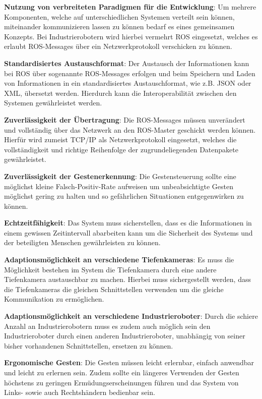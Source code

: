 \begin{compactitem}
    \item \textbf{Nutzung von verbreiteten Paradigmen für die Entwicklung}: Um mehrere Komponenten, welche auf unterschiedlichen Systemen verteilt sein können, miteinander kommunizieren lassen zu können bedarf es eines gemeinsamen Konzepts. Bei Industrierobotern wird hierbei vermehrt ROS eingesetzt, welches es erlaubt ROS-Messages über ein Netzwerkprotokoll verschicken zu können.
    \item \textbf{Standardisiertes Austauschformat}: Der Austausch der Informationen kann bei ROS über sogenannte ROS-Messages erfolgen und beim Speichern und Laden von Informationen in ein standardisiertes Austauschformat, wie z.B. JSON oder XML, übersetzt werden. Hierdurch kann die Interoperabilität zwischen den Systemen gewährleistet werden.
    \item \textbf{Zuverlässigkeit der Übertragung}: Die ROS-Messages müssen unverändert und vollständig über das Netzwerk an den ROS-Master geschickt werden können. Hierfür wird zumeist TCP/IP als Netzwerkprotokoll eingesetzt, welches die vollständigkeit und richtige Reihenfolge der zugrundeliegenden Datenpakete gewährleistet.
    \item \textbf{Zuverlässigkeit der Gestenerkennung}: Die Gestensteuerung sollte eine möglichst kleine Falsch-Positiv-Rate aufweisen um unbeabsichtigte Gesten möglichst gering zu halten und so gefährlichen Situationen entgegenwirken zu können.
    \item \textbf{Echtzeitfähigkeit}: Das System muss sicherstellen, dass es die Informationen in einem gewissen Zeitintervall abarbeiten kann um die Sicherheit des Systems und der beteiligten Menschen gewährleisten zu können.
    \item \textbf{Adaptionsmöglichkeit an verschiedene Tiefenkameras}: Es muss die Möglichkeit bestehen im System die Tiefenkamera durch eine andere Tiefenkamera austauschbar zu machen. Hierbei muss sichergestellt werden, dass die Tiefenkameras die gleichen Schnittstellen verwenden um die gleiche Kommunikation zu ermöglichen.
    \item \textbf{Adaptionsmöglichkeit an verschiedene Industrieroboter}: Durch die schiere Anzahl an Industrierobotern muss es zudem auch möglich sein den Industrieroboter durch einen anderen Industrieroboter, unabhängig von seiner bisher vorhandenen Schnittstellen, ersetzen zu können.
    \item \textbf{Ergonomische Gesten}: Die Gesten müssen leicht erlernbar, einfach anwendbar und leicht zu erlernen sein. Zudem sollte ein längeres Verwenden der Gesten höchstens zu geringen Ermüdungserscheinungen führen und das System von Links- sowie auch Rechtshändern bedienbar sein.

\end{compactitem}
